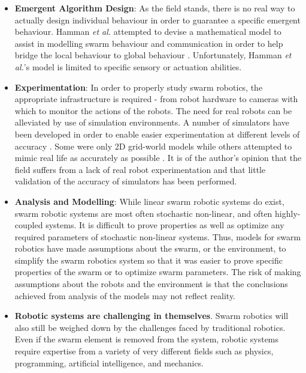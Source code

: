 \begin{itemize}

\item \textbf{Emergent Algorithm Design}: As the field stands, there is no real way to actually design individual behaviour in order to guarantee a specific emergent behaviour. Hamman \textit{et al.} attempted to devise a mathematical model to assist in modelling swarm behaviour and communication in order to help bridge the local behaviour to global behaviour \cite{hamann2008framework}. Unfortunately, Hamman \textit{et al.}'s model is limited to specific sensory or actuation abilities. 

\item \textbf{Experimentation}: In order to properly study swarm robotics, the appropriate infrastructure is required - from robot hardware to cameras with which to monitor the actions of the robots. The need for real robots can be alleviated by use of simulation environments. A number of simulators have been developed in order to enable easier experimentation at different levels of accuracy \cite{vaughan2008massively,pinciroli2011argos, luke2005mason}. Some were only 2D grid-world models while others attempted to mimic real life as accurately as possible \cite{michel1998webots}. It is of the author's opinion that the field suffers from a lack of real robot experimentation and that little validation of the accuracy of simulators has been performed. 

\item \textbf{Analysis and Modelling}: While linear swarm robotic systems do exist, swarm robotic systems are most often stochastic non-linear, and often highly-coupled systems. It is difficult to prove properties as well as optimize any required parameters of stochastic non-linear systems. Thus, models for swarm robotics have made assumptions about the swarm, or the environment, to simplify the swarm robotics system so that it was easier to prove specific properties of the swarm or to optimize swarm parameters. The risk of making assumptions about the robots and the environment is that the conclusions achieved from analysis of the models may not reflect reality.

\item \textbf{Robotic systems are challenging in themselves}. Swarm robotics will also still be weighed down by the challenges faced by traditional robotics. Even if the swarm element is removed from the system, robotic systems require expertise from a variety of very different fields such as physics, programming, artificial intelligence, and mechanics.
\end{itemize}

